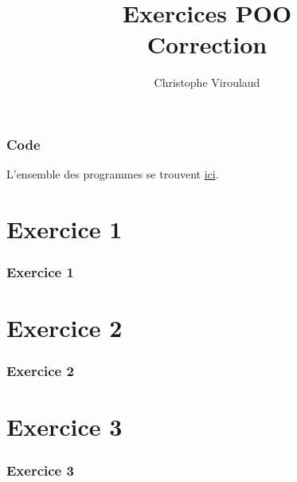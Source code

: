 \documentclass[svgnames,11pt]{beamer}
\author[]{Christophe Viroulaud}
\title{Exercices POO\\Correction}
\date{\framebox{\textbf{Lang 02}}}
\institute{Terminale - NSI}
\begin{document}
\begin{frame}
\titlepage
\end{frame}
\begin{frame}
    \frametitle{Code}

    L'ensemble des programmes se trouvent \href{https://cviroulaud.github.io/terminale/langages/paradigmes/POO/exercices/scripts/poo-correction.zip}{ici}.

\end{frame}
\section{Exercice 1}
\begin{frame}
    \frametitle{Exercice 1}


\end{frame}
\begin{frame}


\end{frame}
\begin{frame}


\end{frame}
\section{Exercice 2}
\begin{frame}
    \frametitle{Exercice 2}


\end{frame}
\begin{frame}


\end{frame}
\section{Exercice 3}
\begin{frame}
    \frametitle{Exercice 3}


\end{frame}
\end{document}

